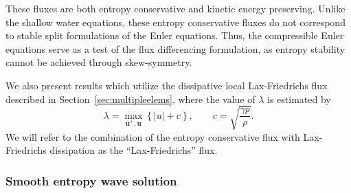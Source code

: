 \documentclass[preprint,10pt]{elsarticle}
\theoremstyle{definition}
\theoremstyle{lemma}
\theoremstyle{theorem}
\theoremstyle{assumption}
\newcommand{\LRp}[1]{\left( #1 \right)}
\newcommand{\LRb}[1]{\left| #1 \right|}
\newcommand{\LRc}[1]{\left\{ #1 \right\}}
\begin{document}
These fluxes are both entropy conservative and kinetic energy preserving.  Unlike the shallow water equations, these entropy conservative fluxes do not correspond to stable split formulations of the Euler equations.  Thus, the compressible Euler equations serve as a test of the flux differencing formulation, as entropy stability cannot be achieved through skew-symmetry.  

We also present results which utilize the dissipative local Lax-Friedrichs flux described in Section~\ref{sec:multipleelems}, where the value of $\lambda$ is estimated by
\[
\lambda = \max_{\bm{u}^+, \bm{u}} \LRc{\LRb{u} + c}, 
\qquad c = \sqrt{\frac{\gamma p}{\rho}}.
\]
We will refer to the combination of the entropy conservative flux with Lax-Friedrichs dissipation as the ``Lax-Friedrichs'' flux.  

\subsubsection{Smooth entropy wave solution}
\end{document}
